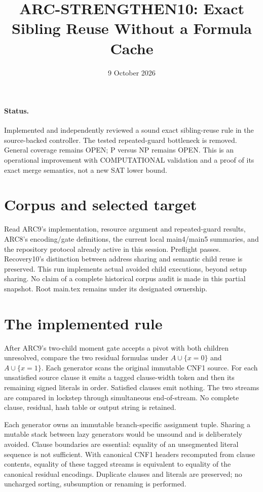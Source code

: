 \documentclass[11pt]{article}
\title{ARC-STRENGTHEN10: Exact Sibling Reuse Without a Formula Cache}
\date{9 October 2026}
\begin{document}
\maketitle
\paragraph{Status.} Implemented and independently reviewed a sound exact
sibling-reuse rule in the source-backed controller. The tested repeated-guard
bottleneck is removed. General coverage remains OPEN; P versus NP remains OPEN.
This is an operational improvement with COMPUTATIONAL validation and a proof
of its exact merge semantics, not a new SAT lower bound.

\section{Corpus and selected target}
Read ARC9's implementation, resource argument and repeated-guard results,
ARC8's encoding/gate definitions, the current local main4/main5 summaries,
and the repository protocol already active in this session. Preflight passes.
Recovery10's distinction between address sharing and semantic child reuse is
preserved. This run implements actual avoided child executions, beyond setup
sharing. No claim of a complete historical corpus audit is made in this partial
snapshot. Root main.tex remains under its designated ownership.

\section{The implemented rule}
After ARC9's two-child moment gate accepts a pivot with both children
unresolved, compare the two residual formulas under $A\cup\{x=0\}$ and
$A\cup\{x=1\}$. Each generator scans the original immutable CNF1 source.
For each unsatisfied source clause it emits a tagged clause-width token and
then its remaining signed literals in order. Satisfied clauses emit nothing.
The two streams are compared in lockstep through simultaneous end-of-stream.
No complete clause, residual, hash table or output string is retained.

Each generator owns an immutable branch-specific assignment tuple. Sharing a
mutable stack between lazy generators would be unsound and is deliberately
avoided. Clause boundaries are essential: equality of an unsegmented literal
sequence is not sufficient. With canonical CNF1 headers recomputed from clause
contents, equality of these tagged streams is equivalent to equality of the
canonical residual encodings. Duplicate clauses and literals are preserved;
no uncharged sorting, subsumption or renaming is performed.
\end{document}
